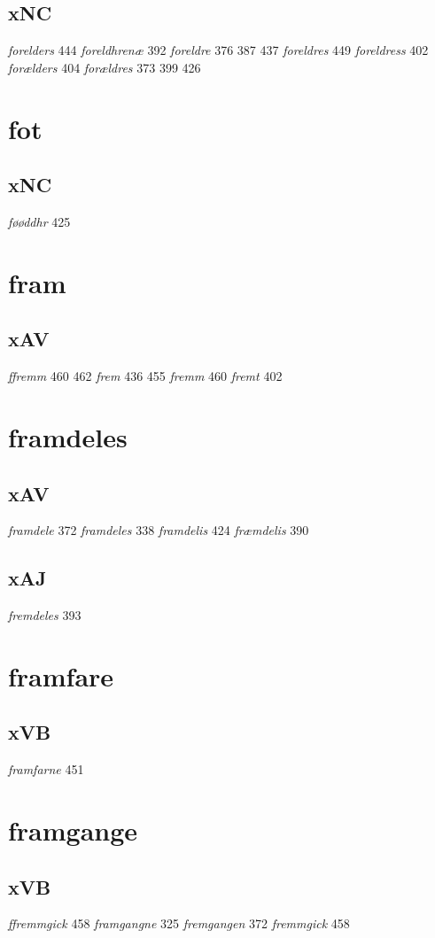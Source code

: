 \documentclass[a4paper,twocolumn]{article}
\begin{document}
\subsection{xNC}
\label{sec:orgc64495e}
\emph{forelders} 444 \emph{foreldhrenæ} 392 \emph{foreldre} 376 387 437 \emph{foreldres} 449 \emph{foreldress} 402 \emph{forælders} 404 \emph{forældres} 373 399 426 
\section{fot}
\label{sec:org61bda27}
\subsection{xNC}
\label{sec:org58df46f}
\emph{føøddhr} 425 
\section{fram}
\label{sec:orga291efb}
\subsection{xAV}
\label{sec:orgb2d3db5}
\emph{ffremm} 460 462 \emph{frem} 436 455 \emph{fremm} 460 \emph{fremt} 402 
\section{framdeles}
\label{sec:orgd8210de}
\subsection{xAV}
\label{sec:orga63d429}
\emph{framdele} 372 \emph{framdeles} 338 \emph{framdelis} 424 \emph{fræmdelis} 390 
\subsection{xAJ}
\label{sec:orgc6f0003}
\emph{fremdeles} 393 
\section{framfare}
\label{sec:org9e67088}
\subsection{xVB}
\label{sec:org364056a}
\emph{framfarne} 451 
\section{framgange}
\label{sec:org1621463}
\subsection{xVB}
\label{sec:org7f8572e}
\emph{ffremmgick} 458 \emph{framgangne} 325 \emph{fremgangen} 372 \emph{fremmgick} 458 
\end{document}
